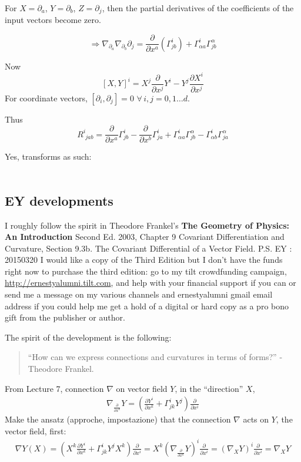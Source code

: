For $X = \partial_a$, $Y = \partial_b$, $Z=\partial_j$, then the partial derivatives of the coefficients of the input vectors become zero.  

\[
\Longrightarrow \nabla_{ \partial_a} \nabla_{\partial_b} \partial_j = \frac{ \partial }{ \partial x^a} (\Gamma^i_{ jb} ) + \Gamma^i_{\alpha a} \Gamma^{\alpha}_{jb}
\]

Now
\[
[X,Y]^i = X^j \frac{ \partial }{ \partial x^j} Y^i - Y^j \frac{ \partial X^i}{ \partial x^j}
\]
For coordinate vectors, $[\partial_i, \partial_j] = 0$ $\forall \, i,j = 0, 1 \dots d$.  

Thus
\[
\boxed{ R^i_{ \, \, jab} = \frac{ \partial }{ \partial x^a} \Gamma^i_{jb} - \frac{ \partial }{ \partial x^b} \Gamma^i_{ja} + \Gamma^i_{\alpha a} \Gamma^{\alpha}_{jb} -\Gamma^i_{\alpha b} \Gamma^{\alpha}_{ja} }
\]



Yes, transforms as such:

\[
\begin{gathered}
  \end{gathered}
\]

\subsection*{EY developments}

I roughly follow the spirit in Theodore Frankel's \textbf{The Geometry of Physics: An Introduction} Second Ed. 2003, Chapter 9 Covariant Differentiation and Curvature, Section 9.3b. The Covariant Differential of a Vector Field. P.S. EY : 20150320 I would like a copy of the Third Edition but I don't have the funds right now to purchase the third edition: go to my tilt crowdfunding campaign, \url{http://ernestyalumni.tilt.com}, and help with your financial support if you can or send me a message on my various channels and ernestyalumni gmail email address if you could help me get a hold of a digital or hard copy as a pro bono gift from the publisher or author.  

The spirit of the development is the following:
\begin{quote}
``How can we express connections and curvatures in terms of forms?'' -Theodore Frankel.  
\end{quote}

From Lecture 7, connection $\nabla$ on vector field $Y$, in the ``direction'' $X$,
\[
\begin{gathered}
  \nabla_{ \frac{ \partial }{ \partial x^k } } Y = \left( \frac{ \partial Y^i }{ \partial x^k } + \Gamma^i_{jk} Y^j  \right) \frac{ \partial }{ \partial x^i }
\end{gathered}
\]
Make the ansatz (approche, impostazione) that the connection $\nabla$ acts on $Y$, the vector field, first:
\[
\begin{gathered}
  \nabla Y(X) = \left( X^k \frac{ \partial Y^i}{ \partial x^k} + \Gamma^i_{jk} Y^j X^k \right) \frac{ \partial}{ \partial x^i } = X^k \left( \nabla_{ \frac{ \partial }{ \partial x^k} } Y \right)^i \frac{ \partial }{ \partial x^i} = (\nabla_X Y)^i \frac{ \partial}{ \partial x^i} = \nabla_XY
\end{gathered}
\]

